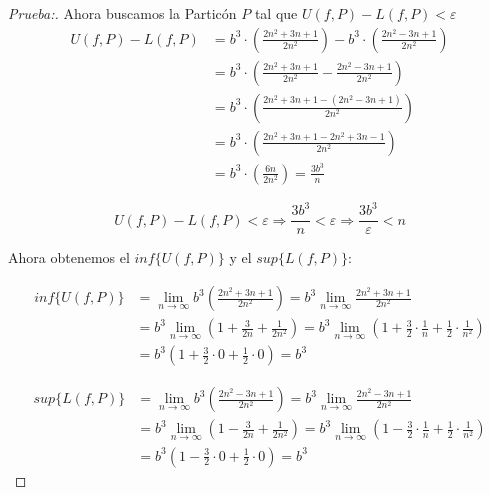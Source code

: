 \documentclass[12pt]{article}
\begin{document}
\begin{enumerate}[\hspace{9px} a)]
\begin{proof}[Prueba:]
            Ahora buscamos la Partic\'on $P$ tal que \(U(f,P)-L(f,P)<\varepsilon\)
            \begin{align*}
                U(f,P)-L(f,P) &= b^3\cdot\left(\frac{2n^2+3n+1}{2n^2}\right)-b^3\cdot\left(\frac{2n^2-3n+1}{2n^2}\right) \\
                &= b^3\cdot\left(\frac{2n^2+3n+1}{2n^2}-\frac{2n^2-3n+1}{2n^2}\right) \\
                &= b^3\cdot\left(\frac{2n^2+3n+1-(2n^2-3n+1)}{2n^2}\right) \\
                &= b^3\cdot\left(\frac{2n^2+3n+1-2n^2+3n-1}{2n^2}\right) \\
                &= b^3\cdot\left(\frac{6n}{2n^2}\right) = \frac{3b^3}{n}
            \end{align*}

            \begin{equation*}
                U(f,P)-L(f,P)<\varepsilon \Longrightarrow \frac{3b^3}{n}<\varepsilon \Longrightarrow \frac{3b^3}{\varepsilon}<n
            \end{equation*}\medskip

            Ahora obtenemos el \(inf\{U(f,P)\}\) y el \(sup\{L(f,P)\}\):

            \begin{align*}
                inf\{U(f,P)\} &= \lim_{n \to \infty}b^3\left(\frac{2n^2+3n+1}{2n^2}\right) = b^3\lim_{n \to \infty}\frac{2n^2+3n+1}{2n^2}\\
                &= b^3\lim_{n \to \infty}\left(1+\frac{3}{2n}+\frac{1}{2n^2}\right) = b^3\lim_{n \to \infty}\left(1+\frac{3}{2}\cdot\frac{1}{n}+\frac{1}{2}\cdot\frac{1}{n^2}\right)\\
                &= b^3\left(1+\frac{3}{2}\cdot0+\frac{1}{2}\cdot0\right) = b^3
            \end{align*}

            \begin{align*}
                sup\{L(f,P)\} &= \lim_{n \to \infty}b^3\left(\frac{2n^2-3n+1}{2n^2}\right) = b^3\lim_{n \to \infty}\frac{2n^2-3n+1}{2n^2}\\
                &= b^3\lim_{n \to \infty}\left(1-\frac{3}{2n}+\frac{1}{2n^2}\right) = b^3\lim_{n \to \infty}\left(1-\frac{3}{2}\cdot\frac{1}{n}+\frac{1}{2}\cdot\frac{1}{n^2}\right)\\
                &= b^3\left(1-\frac{3}{2}\cdot0+\frac{1}{2}\cdot0\right) = b^3
            \end{align*}


\end{proof}
\end{enumerate}
\end{document}
